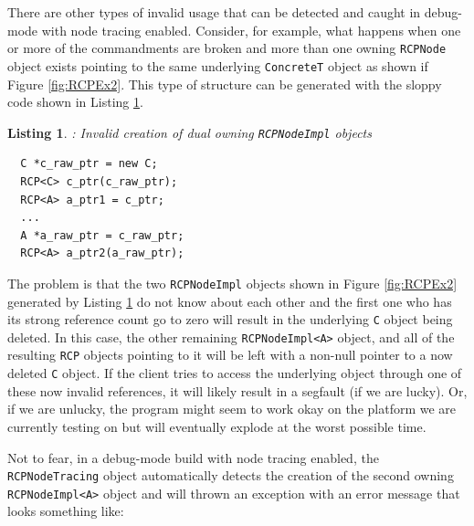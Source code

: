 \documentclass[pdf,ps2pdf,11pt]{SANDreport}
\newtheorem{listing}{Listing}
\begin{document}
There are other types of invalid usage that can be detected and caught
in debug-mode with node tracing enabled.  Consider, for example, what
happens when one or more of the commandments are broken and more than
one owning {}\texttt{RCPNode} object exists pointing to the same
underlying {}\texttt{ConcreteT} object as shown if Figure
{}\ref{fig:RCPEx2}.  This type of structure can be generated with the
sloppy code shown in Listing {}\ref{listing:duplicate_owning_rcp}.

\begin{listing}: Invalid creation of dual owning {}\texttt{RCPNodeImpl}
objects \\
\label{listing:duplicate_owning_rcp}
{\small\begin{verbatim}
  C *c_raw_ptr = new C;
  RCP<C> c_ptr(c_raw_ptr);
  RCP<A> a_ptr1 = c_ptr;
  ...
  A *a_raw_ptr = c_raw_ptr;
  RCP<A> a_ptr2(a_raw_ptr);
\end{verbatim}}
\end{listing}

The problem is that the two {}\texttt{RCPNodeImpl} objects shown in
Figure {}\ref{fig:RCPEx2} generated by Listing
{}\ref{listing:duplicate_owning_rcp} do not know about each other and
the first one who has its strong reference count go to zero will
result in the underlying {}\texttt{C} object being deleted.  In this
case, the other remaining {}\texttt{RCPNodeImpl<A>} object, and all of
the resulting {}\texttt{RCP} objects pointing to it will be left with
a non-null pointer to a now deleted {}\texttt{C} object.  If the
client tries to access the underlying object through one of these now
invalid references, it will likely result in a segfault (if we are
lucky).  Or, if we are unlucky, the program might seem to work okay on
the platform we are currently testing on but will eventually explode
at the worst possible time.

Not to fear, in a debug-mode build with node tracing enabled, the
{}\texttt{RCPNodeTracing} object automatically detects the creation of
the second owning {}\texttt{RCPNodeImpl<A>} object and will thrown an
exception with an error message that looks something like:
\end{document}
